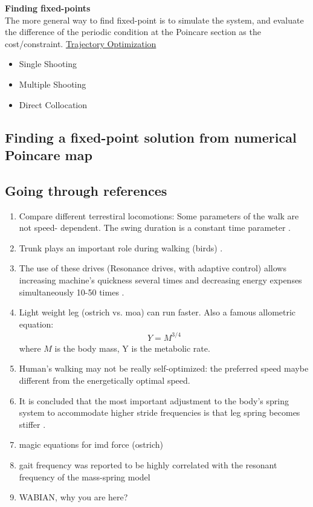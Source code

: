 \documentclass{article}
\begin{document}
\noindent \textbf{Finding fixed-points}\\
The more general way to find fixed-point is to simulate the system, and evaluate the difference of the periodic condition at the Poincare section as the cost/constraint. \underline{Trajectory Optimization}%
\begin{itemize}
\item Single Shooting
\item Multiple Shooting
\item Direct Collocation
\end{itemize}

\subsection{Finding a fixed-point solution from numerical Poincare map}


\subsection{Going through references}
\begin{enumerate}
\item Compare different terrestiral locomotions: Some parameters of the walk are not speed- dependent. The swing duration is a constant time parameter \cite{Abourachid2001}.
\item Trunk plays an important role during walking (birds) \cite{Abourachid2011}.
\item The use of these drives (Resonance drives, with adaptive control) allows increasing machine's quickness several times and decreasing energy expenses simultaneously 10-50 times \cite{Akinfiev1999}.
\item Light weight leg (ostrich vs. moa) can run faster\cite{Alexander1985}. Also a famous allometric equation:
\begin{align}
Y = M^{3/4}
\end{align}
where $M$ is the body mass, Y is the metabolic rate.
\item Human's walking may not be really self-optimized: the preferred speed maybe different from the energetically optimal speed\cite{Arnall2012}.
\item It is concluded that the most important adjustment to the body’s spring system to accommodate higher stride frequencies is that leg spring becomes stiffer \cite{Farley1996}.
\item magic equations for imd force (ostrich) \cite{Jindrich2007}
\item gait frequency was reported to be highly correlated with the resonant frequency of the mass-spring model \cite{Lee2013}
\item WABIAN, why you are here? \cite{Lim2008}
\end{enumerate}
\end{document}
